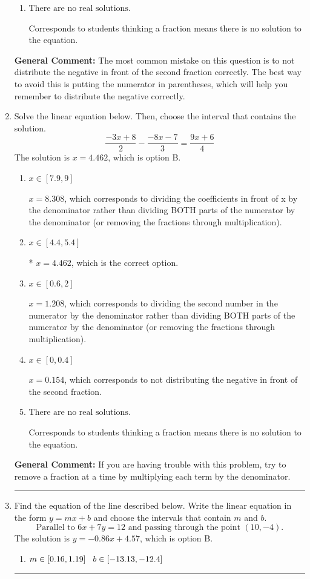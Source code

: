 \documentclass{extbook}[14pt]
\newcommand{\litem}[1]{\item #1

\rule{\textwidth}{0.4pt}}
\begin{document}
\begin{enumerate}
{\begin{enumerate}[label=\Alph*.]
$x = -0.455$, which corresponds to not distributing the negative in front of the second parentheses correctly.
\item \( \text{There are no real solutions.} \)

Corresponds to students thinking a fraction means there is no solution to the equation.
\end{enumerate}

\textbf{General Comment:} The most common mistake on this question is to not distribute the negative in front of the second fraction correctly. The best way to avoid this is putting the numerator in parentheses, which will help you remember to distribute the negative correctly.
}
\litem{
Solve the linear equation below. Then, choose the interval that contains the solution.
\[ \frac{-3x + 8}{2} - \frac{-8x -7}{3} = \frac{9x + 6}{4} \]The solution is \( x = 4.462 \), which is option B.\begin{enumerate}[label=\Alph*.]
\item \( x \in [7.9, 9] \)

 $x = 8.308$, which corresponds to dividing the coefficients in front of x by the denominator rather than dividing BOTH parts of the numerator by the denominator (or removing the fractions through multiplication).
\item \( x \in [4.4, 5.4] \)

* $x = 4.462$, which is the correct option.
\item \( x \in [0.6, 2] \)

 $x = 1.208$, which corresponds to dividing the second number in the numerator by the denominator rather than dividing BOTH parts of the numerator by the denominator (or removing the fractions through multiplication).
\item \( x \in [0, 0.4] \)

 $x = 0.154$, which corresponds to not distributing the negative in front of the second fraction.
\item \( \text{There are no real solutions.} \)

Corresponds to students thinking a fraction means there is no solution to the equation.
\end{enumerate}

\textbf{General Comment:} If you are having trouble with this problem, try to remove a fraction at a time by multiplying each term by the denominator.
}
\litem{
Find the equation of the line described below. Write the linear equation in the form $ y=mx+b $ and choose the intervals that contain $m$ and $b$.
\[ \text{Parallel to } 6 x + 7 y = 12 \text{ and passing through the point } (10, -4). \]The solution is \( y = -0.86x + 4.57 \), which is option B.\begin{enumerate}[label=\Alph*.]
\item \( m \in [0.16, 1.19] \hspace*{3mm} b \in [-13.13, -12.4] \)


\end{enumerate}}
\end{enumerate}
\end{document}
